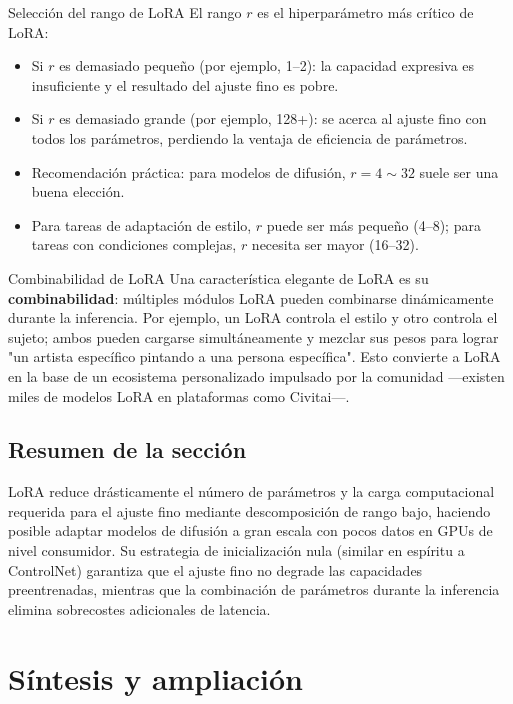 \documentclass[a4paper]{article}
\begin{document}
\begin{warningbox}{Selección del rango de LoRA}
El rango $r$ es el hiperparámetro más crítico de LoRA:
\begin{itemize}
    \item Si $r$ es demasiado pequeño (por ejemplo, 1--2): la capacidad expresiva es insuficiente y el resultado del ajuste fino es pobre.
    \item Si $r$ es demasiado grande (por ejemplo, 128+): se acerca al ajuste fino con todos los parámetros, perdiendo la ventaja de eficiencia de parámetros.
    \item Recomendación práctica: para modelos de difusión, $r = 4 \sim 32$ suele ser una buena elección.
    \item Para tareas de adaptación de estilo, $r$ puede ser más pequeño (4--8); para tareas con condiciones complejas, $r$ necesita ser mayor (16--32).
\end{itemize}
\end{warningbox}

\begin{knowledgebox}{Combinabilidad de LoRA}
Una característica elegante de LoRA es su \textbf{combinabilidad}: múltiples módulos LoRA pueden combinarse dinámicamente durante la inferencia. Por ejemplo, un LoRA controla el estilo y otro controla el sujeto; ambos pueden cargarse simultáneamente y mezclar sus pesos para lograr "un artista específico pintando a una persona específica". Esto convierte a LoRA en la base de un ecosistema personalizado impulsado por la comunidad —existen miles de modelos LoRA en plataformas como Civitai—.
\end{knowledgebox}

\subsection{Resumen de la sección}

LoRA reduce drásticamente el número de parámetros y la carga computacional requerida para el ajuste fino mediante descomposición de rango bajo, haciendo posible adaptar modelos de difusión a gran escala con pocos datos en GPUs de nivel consumidor. Su estrategia de inicialización nula (similar en espíritu a ControlNet) garantiza que el ajuste fino no degrade las capacidades preentrenadas, mientras que la combinación de parámetros durante la inferencia elimina sobrecostes adicionales de latencia.

\newpage
\section{Síntesis y ampliación}
\end{document}
